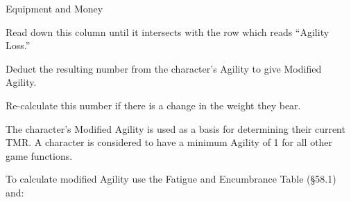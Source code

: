 \begin{Chapter}{Equipment and Money}
\begin{Enumerate}
\item Read down this column until it intersects with the row which
  reads “Agility Loss.”

\item Deduct the resulting number from the character’s Agility to give
  Modified Agility.

\item Re-calculate this number if there is a change in the weight they
  bear.

\end{Enumerate}

The character’s Modified Agility is used as a basis for determining
their current TMR.  A character is considered to have a minimum
Agility of 1 for all other game functions.

To calculate modified Agility use the Fatigue and Encumbrance Table
(§58.1) and:

\end{Chapter}
